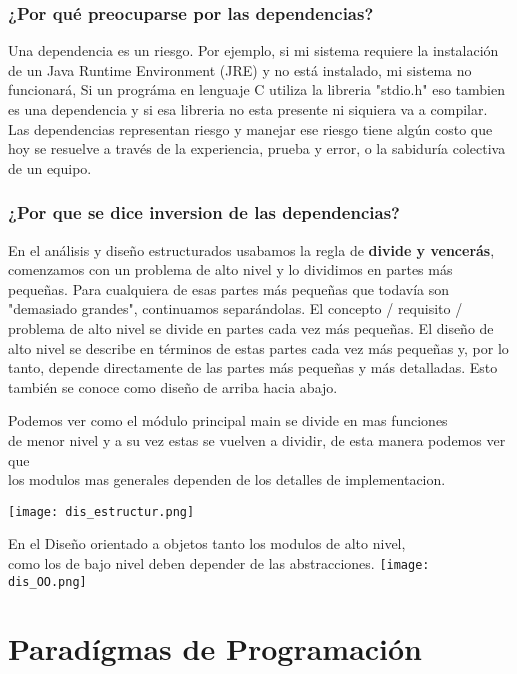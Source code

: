 \documentclass[12pt]{book}
\begin{document}
\subsection{¿Por qué preocuparse por las dependencias?}
Una dependencia es un riesgo. Por ejemplo, si mi sistema requiere la instalación de un Java Runtime Environment (JRE) y no está instalado, mi sistema no funcionará, Si un progr\'ama en lenguaje C utiliza la libreria "stdio.h" eso tambien es una dependencia y si esa libreria no esta presente ni siquiera va a compilar.
\\
Las dependencias representan riesgo y manejar ese riesgo tiene algún costo que hoy se resuelve a través de la experiencia, prueba y error, o la sabiduría colectiva de un equipo.
\subsection{¿Por que se dice inversion de las dependencias?}
En el análisis y diseño estructurados usabamos la regla de \textbf{divide y vencer\'as}, comenzamos con un problema de alto nivel y lo dividimos en partes más pequeñas. Para cualquiera de esas partes más pequeñas que todavía son "demasiado grandes", continuamos separándolas. El concepto / requisito / problema de alto nivel se divide en partes cada vez más pequeñas. El diseño de alto nivel se describe en términos de estas partes cada vez más pequeñas y, por lo tanto, depende directamente de las partes más pequeñas y más detalladas. Esto también se conoce como diseño de arriba hacia abajo.

\begin{center}
Podemos ver como el m\'odulo principal main se divide en mas funciones \\
de menor nivel y a su vez estas se vuelven a dividir, de esta manera podemos ver que\\
los modulos mas generales dependen de los detalles de implementacion.

\texttt{[image: dis\_estructur.png]}
\end{center}

\begin{center}
En el Diseño orientado a objetos tanto los modulos de alto nivel, \\
como los de bajo nivel deben depender de las abstracciones.
\texttt{[image: dis\_OO.png]}
\end{center}



\chapter{Parad\'igmas de Programaci\'on}
\end{document}
